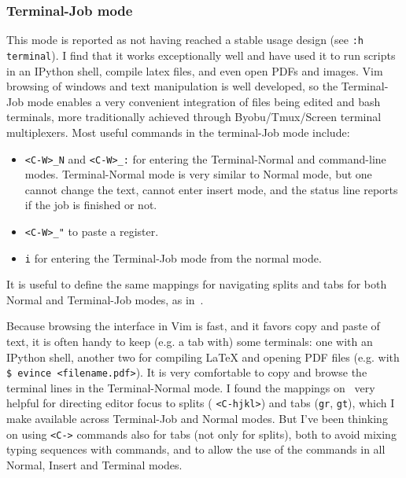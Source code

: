 \documentclass{article}
\newcommand{\ttt}[1] {
	\texttt{<#1>}}
\newcommand{\tttt}[1]{\texttt{#1}}
\begin{document}
\subsubsection{Terminal-Job mode}\label{terminal}
This mode is reported as not having reached a stable usage design
(see \tttt{:h terminal}).
I find that it works exceptionally well and have used it to run
scripts in an IPython shell, compile latex files, and even open PDFs and images.
Vim browsing of windows and text manipulation is well developed,
so the Terminal-Job mode enables a very convenient integration
of files being edited and bash terminals,
more traditionally achieved through Byobu/Tmux/Screen terminal
multiplexers.
Most useful commands in the terminal-Job mode include:
\begin{itemize}
  \item \tttt{<C-W>\_N} and \tttt{<C-W>\_:} for entering the Terminal-Normal
    and command-line modes. Terminal-Normal mode is very similar to
    Normal mode, but one cannot change the text, cannot enter insert
    mode, and the status line reports if the job is finished or not.
  \item \tttt{<C-W>\_"} to paste a register.
  \item \tttt{i} for entering the Terminal-Job mode from the normal mode.
\end{itemize}
\noindent It is useful to define the same mappings for navigating splits and tabs
for both Normal and Terminal-Job modes, as in~\cite{vimrc}.

Because browsing the interface in Vim is fast,
and it favors copy and paste of text,
it is often handy to keep (e.g. a tab with) some terminals:
one with an IPython shell, another two for compiling \LaTeX
and opening PDF files (e.g. with \tttt{\$ evince <filename.pdf>}).
It is very comfortable to copy and browse the terminal lines
in the Terminal-Normal mode.
I found the mappings on~\cite{vimrc} very helpful for directing
editor focus to splits (\ttt{C-hjkl}) and tabs (\tttt{gr}, \tttt{gt}),
which I make available across Terminal-Job and Normal modes.
But I've been thinking on using \ttt{C-} commands also
for tabs (not only for splits), both to avoid mixing typing sequences
with commands, and to allow the use of the commands in all Normal,
Insert and Terminal modes.
\end{document}
